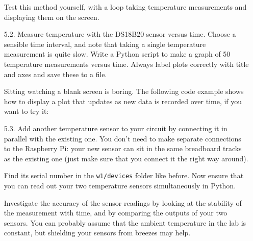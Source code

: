\begin{enumerate}
Test this method yourself, with a loop taking temperature measurements and displaying them on the screen.



\item[5.2.] Measure temperature with the DS18B20 sensor versus time.
Choose a sensible time interval, and note that taking a single temperature measurement is quite slow.
Write a Python script to make a graph of 50 temperature measurements versus time.
Always label plots correctly with title and axes and save these to a file.
 

Sitting watching a blank screen is boring.
The following code example shows how to display a plot that updates as new data is recorded over time, if you want to try it:




\item[5.3.]	Add another temperature sensor to your circuit by connecting it in parallel with the existing one. 
You don't need to make separate connections to the Raspberry Pi: your new sensor can sit in the same breadboard tracks as the existing one (just make sure that you connect it the right way around).

Find its serial number in the \texttt{w1/devices} folder like before.
Now ensure that you can read out your two temperature sensors simultaneously in Python.

%
%
%
%
Investigate the accuracy of the sensor readings by looking at the stability of the measurement with time, and by comparing the outputs of your two sensors.
You can probably assume that the ambient temperature in the lab is constant, but shielding your sensors from breezes may help.


\end{enumerate}
